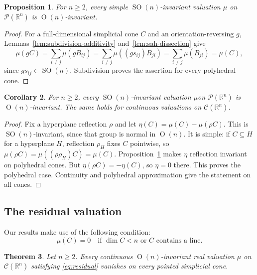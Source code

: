 \documentclass[11pt]{article}
\newcommand{\R}{\mathbb{R}}
\newcommand{\PP}{\mathcal P}
\newcommand{\SOn}[1]{\operatorname{SO}(#1)}
\newcommand{\On}[1]{\operatorname{O}(#1)}
\newcommand{\CC}{\mathcal{C}}
\newtheorem{theorem}{Theorem}[section]
\newtheorem{proposition}[theorem]{Proposition}
\newtheorem{corollary}[theorem]{Corollary}
\begin{document}
\begin{proposition}\label{prop:polyhedral-reflections}
For $n\ge2$, every simple $\SOn n$-invariant valuation $\mu$ on
$\PP(\R^n)$ is $\On n$-invariant.
\end{proposition}

\begin{proof}
For a full-dimensional simplicial cone $C$ and an orientation-reversing
$g$, Lemmas~\ref{lem:subdivision-additivity} and~\ref{lem:sah-dissection}
give
\[
 \mu(gC)=\sum_{i\ne j}\mu(gB_{ij})
 =\sum_{i\ne j}\mu((gs_{ij})B_{ji})
 =\sum_{i\ne j}\mu(B_{ji})=\mu(C),
\]
since $gs_{ij}\in\SOn n$. Subdivision proves the assertion for every
polyhedral cone.
\end{proof}

\begin{corollary}\label{thm:SO=O}
For $n\ge2$, every $\SOn n$-invariant valuation $\mu$on $\PP(\R^n)$ is
$\On n$-invariant. The same holds for continuous valuations on
$\CC(\R^n)$.
\end{corollary}
\begin{proof}
Fix a hyperplane reflection $\rho$ and let
$\eta(C)=\mu(C)-\mu(\rho C)$. This is $\SOn n$-invariant, since that
group is normal in $\On n$. It is simple: if $C\subseteq H$ for a
hyperplane $H$, reflection $\rho_H$ fixes $C$ pointwise, so
$\mu(\rho C)=\mu((\rho\rho_H)C)=\mu(C)$.
Proposition~\ref{prop:polyhedral-reflections} makes $\eta$ reflection
invariant on polyhedral cones. But $\eta(\rho C)=-\eta(C)$, so $\eta=0$
there. This proves the polyhedral case. Continuity and polyhedral
approximation give the statement on all cones.
\end{proof}

\subsection{The residual valuation}
Our results make use of the following condition:
\begin{equation}\tag{A}\label{eq:residual}
 \mu(C)=0\quad\text{if }\dim C<n\text{ or }C\text{ contains a line}.
\end{equation}

\begin{theorem}\label{thm:simplicial-vanishing}
Let $n\ge2$. Every continuous $\On n$-invariant real valuation $\mu$ on
$\CC(\R^n)$ satisfying \eqref{eq:residual} vanishes on every pointed
simplicial cone.
\end{theorem}
\end{document}
